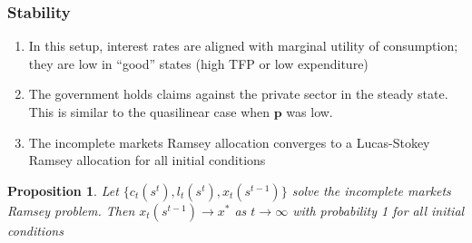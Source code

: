 \documentclass{beamer}
\newcommand{\EE}{\mathbb E}
\newtheorem{proposition}{Proposition}
\begin{document}
%
%
%
\begin{frame}
	\frametitle{Stability}
	\begin{enumerate}
	 \item In this setup, interest rates are aligned with marginal utility of consumption;  they are low  in ``good'' states (high TFP or low expenditure)
	 \item The government holds claims against the private sector in the steady state. This is similar to the quasilinear case when $\bm{p}$ was low.	 
	 \item The incomplete markets Ramsey allocation converges to a Lucas-Stokey  Ramsey allocation for all initial conditions	 	
	\end{enumerate}


	\begin{proposition}  Let $\{c_t(s^t), l_t(s^t), x_t(s^{t-1})\}$ solve the incomplete markets Ramsey problem.  Then  $x_t(s^{t-1})\rightarrow x^*$ as $t\rightarrow \infty$ with probability 1 for all initial conditions
	
	\end{proposition}
	\end{frame}
	
\end{document}

